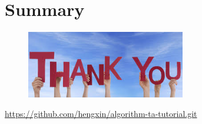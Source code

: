 \section*{Summary}
\begin{frame}{}
  \begin{figure}[htp]
    \begin{center}
      \includegraphics[width=0.618\textwidth]{fig/thankyou.jpg}
    \end{center}
  \end{figure}
  
  \begin{center}
    \url{https://github.com/hengxin/algorithm-ta-tutorial.git}
  \end{center}
\end{frame}
